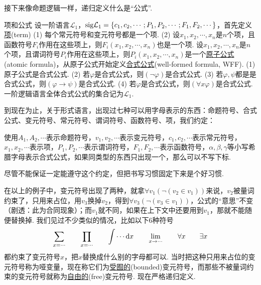 接下来像命题逻辑一样，递归定义什么是“公式”.

\begin{definition}{项和公式}
    设一阶语言\(\mathcal{L}_1\)，\({\rm sig}\mathcal{L}_1 = \{ c_1, c_2, \cdots; P_1, P_2, \cdots; F_1, F_2, \cdots \}\)，首先定义\underline{项}(term) \newline
    (1) 每个常元符号和变元符号都是一个项. \newline
    (2) 设\(x_1, x_2, \cdots, x_n\)是\(n\)个项，且函数符号\(F_i\)作用在这些项上，则\(F_i(x_1, x_2, \cdots, x_n)\)也是一个项. \newline
    设\(x_1, x_2, \cdots, x_n\)是\(n\)个项，且谓词符号\(P_i\)作用在这些项上，则\(P_i(x_1, x_2, \cdots, x_n)\)是一个\underline{原子公式}(atomic formula)，从原子公式开始定义\underline{合式公式}(well-formed formula, WFF). \newline
    (1) 原子公式是合式公式. \newline
    (2) 若\(\varphi\)是合式公式，则\((\neg \varphi)\)是合式公式. \newline
    (3) 若\(\varphi, \psi\)都是是合式公式，则\((\varphi \to \psi)\)是合式公式. \newline
    (4) 若\(\varphi\)是合式公式，则\((\forall x \varphi)\)是合式公式.\newline
    一阶逻辑语言全体合式公式的集合记为\(\mathcal{L}_1\).
\end{definition}

到现在为止，关于形式语言，出现过七种可以用字母表示的东西：命题符号、合式公式、变元符号、常元符号、谓词符号、函数符号、项，我们约定：
\begin{reference}
    使用\(A_1, A_2, \cdots\)表示命题符号，\(v_1, v_2, \cdots\)表示变元符号，\(c_1, c_2, \cdots\)表示常元符号，\(x_1, x_2, \cdots\)表示项，\(P_1, P_2, \cdots\)表示谓词符号，\(F_1, F_2, \cdots\)表示函数符号，\(\alpha, \beta, \gamma\)等小写希腊字母表示合式公式，如果同类型的东西只出现一个，那么可以不写下标.
\end{reference}
尽管不能保证一定能遵守这个约定，但把书写习惯固定下来是个好习惯.

在以上的例子中，变元符号出现了两种，就拿\(\forall v_1 (\neg (v_2 \in v_1))\)来说，\(v_2\)被量词约束了，只用来占位，用\(v_3\)换掉\(v_2\)，得到\(\forall v_3 (\neg (v_3 \in v_1))\)，公式的“意思”不变（剧透：此为合同现象）；而\(v_1\)就不同，如果在上下文中还要用到\(v_1\)，那就不能随便替换掉. 我们见过不少类似的情况，比如以下6种符号
\[\sum_{x=\cdots} \qquad \prod_{x=\cdots} \qquad \int \cdots {\rm d}x \qquad \lim_{x \to \cdots} \qquad \forall x \qquad \exists x\]
都约束了变元符号\(x\)，把\(x\)替换成什么别的字母都可以. 当时把这种只用来占位的变元符号称为哑变量，现在称它们为\underline{受囿的}(bounded)变元符号，而那些不被量词约束的变元符号就称为\underline{自由的}(free)变元符号. 现在严格递归定义.

